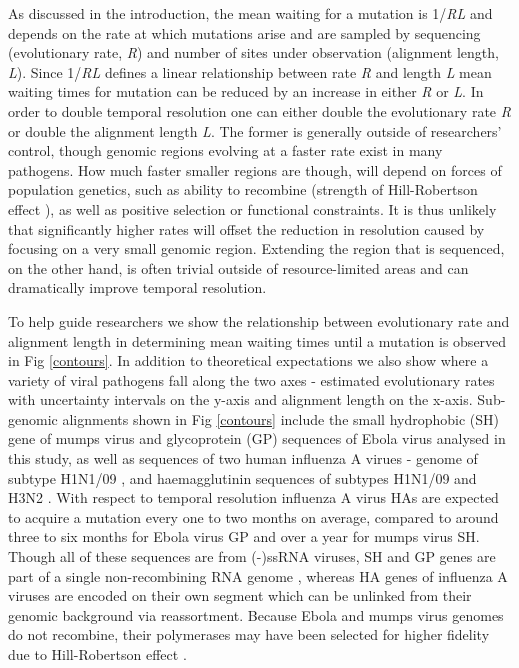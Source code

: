 \documentclass[11pt,oneside,letterpaper]{article}
\begin{document}
As discussed in the introduction, the mean waiting for a mutation is 1/\textit{RL} and depends on the rate at which mutations arise and are sampled by sequencing (evolutionary rate, \textit{R}) and number of sites under observation (alignment length, \textit{L}).
Since 1/\textit{RL} defines a linear relationship between rate \textit{R} and length \textit{L} mean waiting times for mutation can be reduced by an increase in either \textit{R} or \textit{L}.
In order to double temporal resolution one can either double the evolutionary rate \textit{R} or double the alignment length \textit{L}.
The former is generally outside of researchers' control, though genomic regions evolving at a faster rate exist in many pathogens.
How much faster smaller regions are though, will depend on forces of population genetics, such as ability to recombine (strength of Hill-Robertson effect \citep{hill_effect_1966}), as well as positive selection or functional constraints.
It is thus unlikely that significantly higher rates will offset the reduction in resolution caused by focusing on a very small genomic region.
Extending the region that is sequenced, on the other hand, is often trivial outside of resource-limited areas and can dramatically improve temporal resolution.

To help guide researchers we show the relationship between evolutionary rate and alignment length in determining mean waiting times until a mutation is observed in Fig \ref{contours}.
In addition to theoretical expectations we also show where a variety of viral pathogens fall along the two axes - estimated evolutionary rates with uncertainty intervals on the y-axis and alignment length on the x-axis.
Sub-genomic alignments shown in Fig \ref{contours} include the small hydrophobic (SH) gene of mumps virus \citep{cui_evolutionary_2017} and glycoprotein (GP) sequences of Ebola virus analysed in this study, as well as sequences of two human influenza A virues - genome of subtype H1N1/09 \citep{hedge_real-time_2013}, and haemagglutinin sequences of subtypes H1N1/09 \citep{smith_origins_2009} and H3N2 \citep{rambaut_genomic_2008}.
With respect to temporal resolution influenza A virus HAs are expected to acquire a mutation every one to two months on average, compared to around three to six months for Ebola virus GP and over a year for mumps virus SH.
Though all of these sequences are from (-)ssRNA viruses, SH and GP genes are part of a single non-recombining RNA genome \citep{chare_phylogenetic_2003}, whereas HA genes of influenza A viruses are encoded on their own segment which can be unlinked from their genomic background via reassortment.
Because Ebola and mumps virus genomes do not recombine, their polymerases may have been selected for higher fidelity due to Hill-Robertson effect \citep{hill_effect_1966}.
\end{document}

